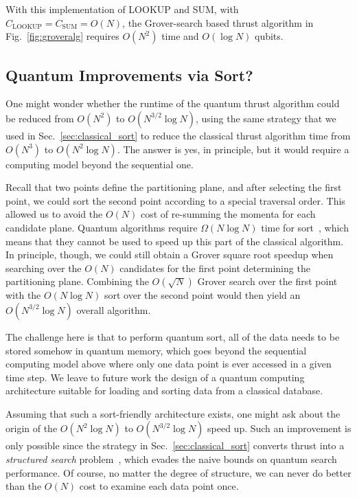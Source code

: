 \documentclass[aps,prd,twocolumn,superscriptaddress,preprintnumbers,nofootinbib,longbibliography,floatfix]{revtex4-1}
\DeclareRobustCommand{\Sec}[1]{Sec.~\ref{#1}}
\DeclareRobustCommand{\Fig}[1]{Fig.~\ref{#1}}
\begin{document}
With this implementation of LOOKUP and SUM, with $C_{\text{LOOKUP}} = C_{\text{SUM}} = O(N)$, the Grover-search based thrust algorithm in \Fig{fig:groveralg} requires $O(N^2)$ time and $O(\log N)$ qubits.


\subsection{Quantum Improvements via Sort?}
\label{subsec:groverseq_sort}

One might wonder whether the runtime of the quantum thrust algorithm could be reduced from $O(N^2)$ to $O(N^{3/2}\log N)$, using the same strategy that we used in \Sec{sec:classical_sort} to reduce the classical thrust algorithm time from $O(N^3)$ to $O(N^2\log N)$.
%
The answer is yes, in principle, but it would require a computing model beyond the sequential one.


Recall that two points define the partitioning plane, and after selecting the first point, we could sort the second point according to a special traversal order.
%
This allowed us to avoid the $O(N)$ cost of re-summing the momenta for each candidate plane.
%
Quantum algorithms require $\Omega(N\log N)$ time for sort~\cite{Hoyer2002}, which means that they cannot be used to speed up this part of the classical algorithm.
%
In principle, though, we could still obtain a Grover square root speedup when searching over the $O(N)$ candidates for the first point determining the partitioning plane.
%
Combining the $O(\sqrt{N})$ Grover search over the first point with the $O(N\log N)$ sort over the second point would then yield an $O(N^{3/2}\log N)$ overall algorithm. 


The challenge here is that to perform quantum sort, all of the data needs to be stored somehow in quantum memory, which goes beyond the sequential computing model above where only one data point is ever accessed in a given time step.
%
We leave to future work the design of a quantum computing architecture suitable for loading and sorting data from a classical database.


Assuming that such a sort-friendly architecture exists, one might ask about the origin of the $O(N^2 \log N)$ to $O(N^{3/2}\log N)$ speed up.
%
Such an improvement is only possible since the strategy in \Sec{sec:classical_sort} converts thrust into a \emph{structured search} problem~\cite{2015arXiv150902374M,2019arXiv190610375M}, which evades the naive bounds on quantum search performance.
%
Of course, no matter the degree of structure, we can never do better than the $O(N)$ cost to examine each data point once.
\end{document}
